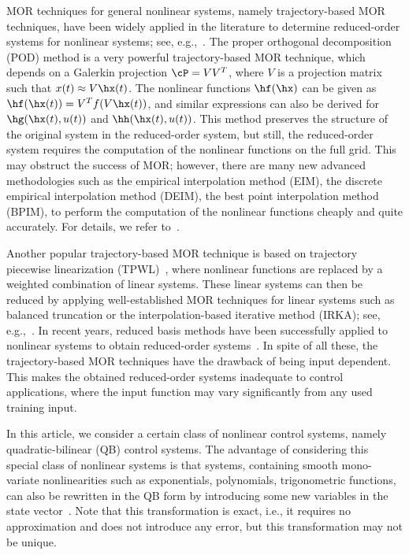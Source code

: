MOR techniques  for general nonlinear systems, namely trajectory-based MOR techniques, have been widely applied in the literature to determine  reduced-order systems for nonlinear systems; see, e.g.,~\cite{morAstWWetal08,morChaS10,morHinV05}. The proper orthogonal decomposition (POD) method is a very powerful trajectory-based MOR technique, which depends on a Galerkin projection $\cP = VV^T$, where $V$ is a projection matrix such that $x(t) \approx V\hx(t)$. The nonlinear functions $\hf(\hx)$ can be given as $\hf(\hx(t)) = V^Tf(V\hx(t))$, and  similar expressions  can also be derived for $\hg(\hx(t),u(t))$ and $\hh(\hx(t),u(t))$. This method preserves the structure of the original system in the reduced-order system, but still, the reduced-order system requires the computation of the nonlinear functions on the full grid. This may obstruct the success  of MOR;  however, there are many new advanced methodologies such as the empirical interpolation method (EIM), the discrete empirical  interpolation method (DEIM), the best point interpolation method (BPIM),  to perform the computation of the nonlinear functions cheaply and quite accurately. For details, we refer to~\cite{morBarMNetal04,morChaS10,drmac2016new,morGreMNetal07}.

Another popular trajectory-based MOR technique is based on trajectory piecewise linearization (TPWL)~\cite{morRew03}, where nonlinear functions are replaced by a weighted combination of linear systems. These linear systems  can then  be reduced by applying  well-established MOR techniques for linear systems such as balanced truncation or the interpolation-based iterative method (IRKA); see, e.g.,~\cite{morAnt05,morGugAB08}. In recent years, reduced basis methods have been successfully applied to nonlinear systems to obtain  reduced-order systems~\cite{morBarMNetal04,morGreMNetal07}. In spite of all these, the trajectory-based MOR techniques have the drawback  of being input dependent. This makes the obtained reduced-order systems inadequate to  control applications, where the input function may vary significantly from any used training input. 

In this article, we consider a certain class of  nonlinear control systems, namely quadratic-bilinear (QB) control systems. The advantage of considering this special class of  nonlinear systems is that systems, containing smooth mono-variate nonlinearities such as exponentials, polynomials, trigonometric functions, can also be rewritten in the QB form by introducing some new variables in the state vector~\cite{morGu09}.  Note that this transformation is exact, i.e., it requires no approximation and does not introduce any error, but this transformation may not be unique. 

